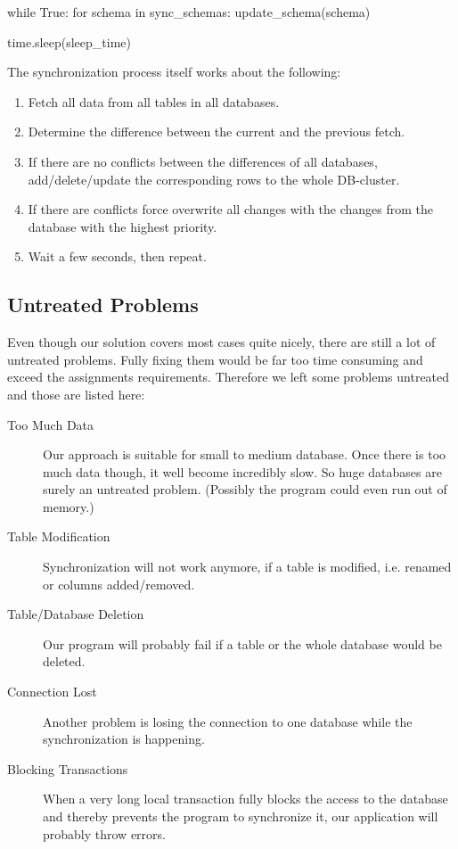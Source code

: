 \documentclass[11pt, a4paper]{article}
\begin{document}
\vspace{10pt}
\begin{python}
while True:
    for schema in sync_schemas:
        update_schema(schema)

    time.sleep(sleep_time)
\end{python}
\vspace{10pt}

The synchronization process itself works about the following:

\vspace{-10pt}
\begin{enumerate}
	\item Fetch all data from all tables in all databases.
	\item Determine the difference between the current and the previous fetch.
	\item If there are no conflicts between the differences of all databases, add/delete/update the corresponding rows to the whole DB-cluster.
	\item If there are conflicts force overwrite all changes with the changes from the database with the highest priority.
	\item Wait a few seconds, then repeat.
\end{enumerate}

\subsection{Untreated Problems}

Even though our solution covers most cases quite nicely, there are still a lot of untreated problems. Fully fixing them would be far too time consuming and exceed the assignments requirements. Therefore we left some problems untreated and those are listed here:

\begin{description}
	
	\item[Too Much Data] Our approach is suitable for small to medium database. Once there is too much data though, it well become incredibly slow. So huge databases are surely an untreated problem. (Possibly the program could even run out of memory.)
	
	\item[Table Modification] Synchronization will not work anymore, if a table is modified, i.e. renamed or columns added/removed.
	
	\item[Table/Database Deletion] Our program will probably fail if a table or the whole database would be deleted.
	\item[Connection Lost] Another problem is losing the connection to one database while the 
	synchronization is happening.
	
	\item[Blocking Transactions] When a very long local transaction fully blocks the access to the database and thereby prevents the program to synchronize it, our application will probably throw errors.
	
\end{description}
\end{document}
